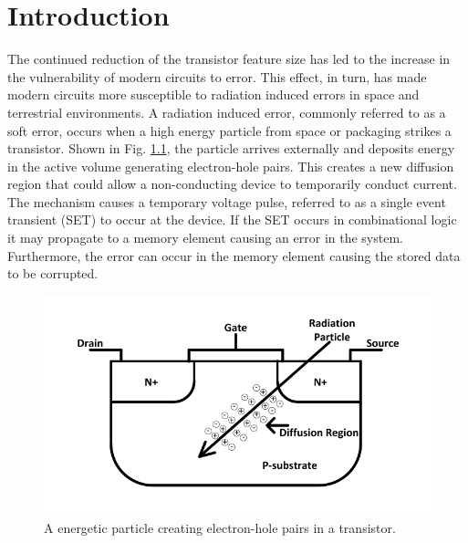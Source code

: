 

\chapter{Introduction} \label{ch0}

The continued reduction of the transistor feature size has led to the increase in the vulnerability of modern circuits to error. This effect, in turn, has made modern circuits more susceptible to radiation induced errors in space and terrestrial environments. A radiation induced error, commonly referred to as a soft error, occurs when a high energy particle from space or packaging strikes a transistor. Shown in Fig. \ref{strike}, the particle arrives externally and deposits energy in the active volume generating electron-hole pairs. This creates a new diffusion region that could allow a non-conducting device to temporarily conduct current. The mechanism causes a temporary voltage pulse, referred to as a single event transient (SET) to occur at the device. If the SET occurs in combinational logic it may propagate to a memory element causing an error in the system. Furthermore, the error can occur in the memory element causing the stored data to be corrupted.

\begin{figure}[!htbp]
	\centering
	\includegraphics[width=0.50\linewidth]{Figures/StrikeFig}
	\caption{A energetic particle creating electron-hole pairs in a transistor.}
	\label{strike}
\end{figure} 

